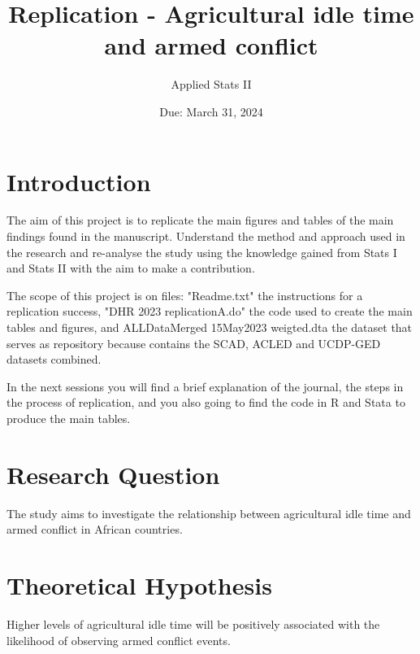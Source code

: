 \documentclass[12pt,letterpaper]{article}
\title{Replication - Agricultural idle time and armed conflict}
\date{Due: March 31, 2024}
\author{Applied Stats II}
\begin{document}
	\maketitle
	\section*{Introduction}
The aim of this project is to replicate the main figures and tables of the main findings found in the manuscript. Understand the method and approach used in the research and re-analyse the study using the knowledge gained from Stats I and Stats II with the aim to make a contribution.  

The scope of this project is on files: "Readme.txt" the instructions for a replication success, "DHR 2023 replicationA.do" the code used to create the main tables and figures, and ALLDataMerged 15May2023 weigted.dta  the dataset that serves as repository because contains the SCAD, ACLED and UCDP-GED datasets combined. 

In the next sessions you will find a brief explanation of the journal, the steps in the process of replication, and you also going to find the code in R and Stata to produce the main tables. 	
	\section*{Research Question}
The study aims to investigate the relationship between agricultural idle time and armed conflict in African countries.

	\section*{Theoretical Hypothesis}
Higher levels of agricultural idle time will be positively associated with the likelihood of observing armed conflict events.

	\vspace{.25cm}
\end{document}
